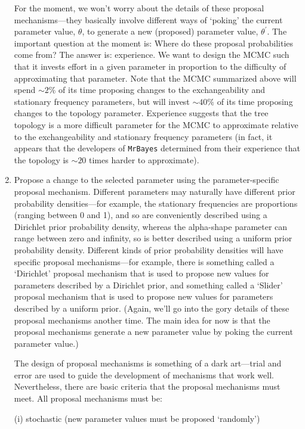 \documentclass[11pt]{article}
\begin{document}
\begin{enumerate}
{For the moment, we won’t worry about the details of these proposal mechanisms—they basically involve different ways of `poking’ the current parameter value, $\theta$, to generate a new (proposed) parameter value, $\theta ^{\prime}$. The important question at the moment is: Where do these proposal probabilities come from? The answer is: experience. We want to design the MCMC such that it invests effort in a given parameter in proportion to the difficulty of approximating that parameter. Note that the MCMC summarized above will spend $\sim 2\%$ of its time proposing changes to the exchangeability and stationary frequency parameters, but will invest $\sim 40\%$ of its time proposing changes to the topology parameter. Experience suggests that the tree topology is a more difficult parameter for the MCMC to approximate relative to the exchangeability and stationary frequency parameters (in fact, it appears that the developers of \verb!MrBayes! determined from their experience that the topology is $\sim 20$ times harder to approximate).}

\item{Propose a change to the selected parameter using the parameter-specific proposal
mechanism. Different parameters may naturally have different prior probability densities—for example, the stationary frequencies are proportions (ranging between 0 and 1), and so are conveniently described using a Dirichlet prior probability density, whereas the alpha-shape parameter can range between zero and infinity, so is better described using a uniform prior probability density. Different kinds of prior probability densities will have specific proposal mechanisms—for example, there is something called a `Dirichlet’ proposal mechanism that is used to propose new values for parameters described by a Dirichlet prior, and something called a `Slider’ proposal mechanism that is used to propose new values for parameters described by a uniform prior. (Again, we’ll go into the gory details of these proposal mechanisms another time. The main idea for now is that the proposal mechanisms generate a new parameter value by poking the current parameter value.)

The design of proposal mechanisms is something of a dark art—trial and error are used to guide the development of mechanisms that work well. Nevertheless, there are basic criteria that the proposal mechanisms must meet. All proposal mechanisms must be:

(i) stochastic (new parameter values must be proposed `randomly’)

}
\end{enumerate}
\end{document}
